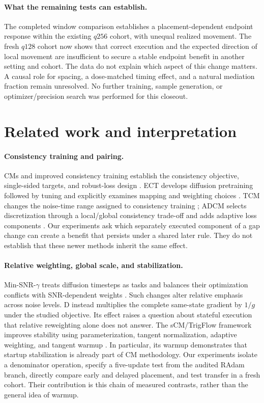 \paragraph{What the remaining tests can establish.}
The completed window comparison establishes a placement-dependent endpoint response within the existing $q256$ cohort, with unequal realized movement. The fresh $q128$ cohort now shows that correct execution and the expected direction of local movement are insufficient to secure a stable endpoint benefit in another setting and cohort. The data do not explain which aspect of this change matters. A causal role for spacing, a dose-matched timing effect, and a natural mediation fraction remain unresolved. No further training, sample generation, or optimizer/precision search was performed for this closeout.

\section{Related work and interpretation}
\label{sec:related}
\paragraph{Consistency training and pairing.}
CMs and improved consistency training establish the consistency objective, single-sided targets, and robust-loss design \citep{song2023consistency,song2024improved}. ECT develops diffusion pretraining followed by tuning and explicitly examines mapping and weighting choices \citep{geng2025ect}. TCM changes the noise-time range assigned to consistency training \citep{lee2024tcm}; ADCM selects discretization through a local/global consistency trade-off and adds adaptive loss components \citep{bai2025adcm}. Our experiments ask which separately executed component of a gap change can create a benefit that persists under a shared later rule. They do not establish that these newer methods inherit the same effect.

\paragraph{Relative weighting, global scale, and stabilization.}
Min-SNR-$\gamma$ treats diffusion timesteps as tasks and balances their optimization conflicts with SNR-dependent weights \citep{hang2023minsnr}. Such changes alter relative emphasis across noise levels. D instead multiplies the complete same-state gradient by $1/g$ under the studied objective. Its effect raises a question about stateful execution that relative reweighting alone does not answer. The sCM/TrigFlow framework improves stability using parameterization, tangent normalization, adaptive weighting, and tangent warmup \citep{lu2025scm}. In particular, its warmup demonstrates that startup stabilization is already part of CM methodology. Our experiments isolate a denominator operation, specify a five-update test from the audited RAdam branch, directly compare early and delayed placement, and test transfer in a fresh cohort. Their contribution is this chain of measured contrasts, rather than the general idea of warmup.

